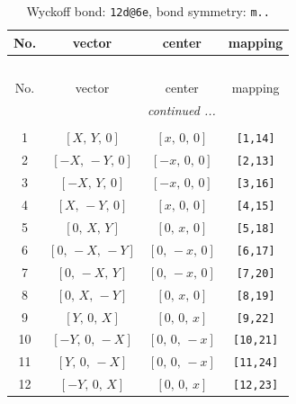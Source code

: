 \documentclass[fleqn,8pt]{jsarticle}
\begin{document}
\begin{longtable}{cccc}
\caption{Wyckoff bond: {\tt 12d@6e}, bond symmetry: {\tt m..}}
 \\
 \hline \hline
No. & vector & center & mapping \\ \hline \endfirsthead

\multicolumn{3}{l}{\tablename\ \thetable{}} \\
 \hline \hline
No. & vector & center & mapping \\ \hline \endhead

 \hline \hline
\multicolumn{3}{r}{\footnotesize\it continued ...} \\ \endfoot

 \hline \hline
\multicolumn{3}{r}{} \\ \endlastfoot

1 & $\left[ X,\, Y,\, 0 \right]$ & $\left[ x,\, 0,\, 0 \right]$ & {\tt [1,14]} \\ \hline
2 & $\left[ - X,\, - Y,\, 0 \right]$ & $\left[ - x,\, 0,\, 0 \right]$ & {\tt [2,13]} \\ \hline
3 & $\left[ - X,\, Y,\, 0 \right]$ & $\left[ - x,\, 0,\, 0 \right]$ & {\tt [3,16]} \\ \hline
4 & $\left[ X,\, - Y,\, 0 \right]$ & $\left[ x,\, 0,\, 0 \right]$ & {\tt [4,15]} \\ \hline
5 & $\left[ 0,\, X,\, Y \right]$ & $\left[ 0,\, x,\, 0 \right]$ & {\tt [5,18]} \\ \hline
6 & $\left[ 0,\, - X,\, - Y \right]$ & $\left[ 0,\, - x,\, 0 \right]$ & {\tt [6,17]} \\ \hline
7 & $\left[ 0,\, - X,\, Y \right]$ & $\left[ 0,\, - x,\, 0 \right]$ & {\tt [7,20]} \\ \hline
8 & $\left[ 0,\, X,\, - Y \right]$ & $\left[ 0,\, x,\, 0 \right]$ & {\tt [8,19]} \\ \hline
9 & $\left[ Y,\, 0,\, X \right]$ & $\left[ 0,\, 0,\, x \right]$ & {\tt [9,22]} \\ \hline
10 & $\left[ - Y,\, 0,\, - X \right]$ & $\left[ 0,\, 0,\, - x \right]$ & {\tt [10,21]} \\ \hline
11 & $\left[ Y,\, 0,\, - X \right]$ & $\left[ 0,\, 0,\, - x \right]$ & {\tt [11,24]} \\ \hline
12 & $\left[ - Y,\, 0,\, X \right]$ & $\left[ 0,\, 0,\, x \right]$ & {\tt [12,23]} \\
\end{longtable}
\renewcommand{\arraystretch}{1.2}
\end{document}
